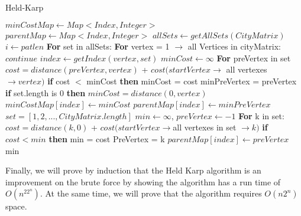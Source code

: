 \documentclass[a4paper,titlepage, margin, 11pt]{article}
\numberwithin{equation}{section}
\begin{document}
\begin{algorithm}
\caption{Held-Karp}\label{euclid}
\begin{algorithmic}[1]
\State $\textit{minCostMap} \gets Map<Index,Integer>$
\State $\textit{parentMap} \gets Map<Index,Integer>$
\State $allSets \gets getAllSets(CityMatrix)$
\State $i \gets \textit{patlen}$
\BState \textbf{For} set in allSets:
	\State \textbf{For} vertex = 1 $\rightarrow$ all Vertices in cityMatrix:
		\Indent
		  $continue$
		\EndIf
		\State $index \gets getIndex(vertex,set)$
		\State $minCost \gets \infty$
		\State \textbf{For} preVertex in set
			\Indent
			\State $cost = distance(preVertex, vertex)$  
			\State + $cost(startVertex \rightarrow$ all vertexes $\rightarrow vertex)$
			\State \textbf{if}  cost $<$ minCost \textbf{then}
				\Indent
				\State minCost = cost
				\State minPreVertex = preVertex
				\EndIndent
			\State \textbf{if}  set.length is 0 \textbf{then} $minCost = distance(0,vertex)$
			\State $minCostMap[index] \gets minCost$
			\State $parentMap[index] \gets minPreVertex$
			\EndIndent
		\EndIndent
\State $set = [1,2,...,CityMatrix.length]$
 \State $min \gets \infty $, $ preVertex \gets -1$
 \BState \textbf{For} k in set:
 \State $cost = distance(k, 0)$  
			\State + $cost(startVertex \rightarrow $all vertexes in set $\rightarrow k)$
			\State \textbf{if}$  cost < min$ \textbf{then}
				\Indent
				\State min = cost
				\State PreVertex = k
				\EndIndent
\BState $parentMap[index] \gets preVertex$\\
\Return min
\EndProcedure
\end{algorithmic}
\end{algorithm}

\newpage

Finally, we will prove by induction that the Held Karp algorithm is an improvement on the brute force by showing the algorithm has a run time of $O(n^22^n)$. At the same time, we will prove that the algorithm requires $O(n2^n)$ space.\\ 
\end{document}
